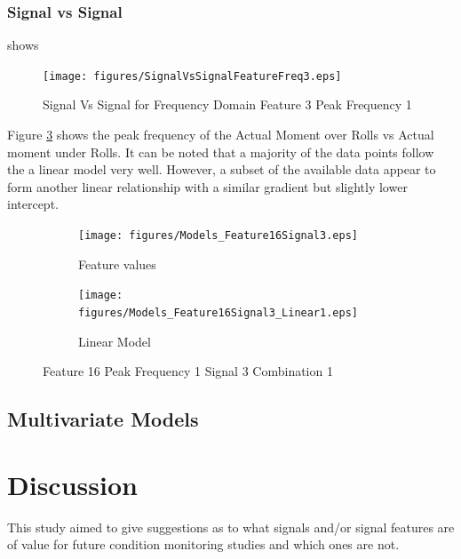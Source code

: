 \documentclass[]{article}
\begin{document}
\subsubsection*{Signal vs Signal}
 shows 
\begin{figure}[H]
    \centering
    \texttt{[image: figures/SignalVsSignalFeatureFreq3.eps]}
    \caption{Signal Vs Signal for Frequency Domain Feature 3 Peak Frequency 1}
    \label{fig:SignalVsSignalFeatureFreq3}
\end{figure}
Figure \ref{fig:Models_Feature16Signal3_Linear1} shows the peak frequency of the Actual Moment over Rolls vs Actual moment under Rolls. It can be noted that a majority of the data points follow the a linear model very well. However, a subset of the available data appear to form another linear relationship with a similar gradient but slightly lower intercept.
\begin{figure}[H]
	\centering
	\begin{subfigure}{.5\textwidth}
		\centering
    		\texttt{[image: figures/Models\_Feature16Signal3.eps]}
	 	\caption{Feature values}
	  	\label{fig:Models_Feature16Signal3}
	\end{subfigure}%
	\begin{subfigure}{.5\textwidth}
	  \centering
 	   	\texttt{[image: figures/Models\_Feature16Signal3\_Linear1.eps]}
	  	\caption{Linear Model}
	  	\label{fig:Models_Feature16Signal3_Linear1}
	\end{subfigure}
   	\caption{Feature 16 Peak Frequency 1 Signal 3 Combination 1}
    \label{fig:Models_Feature16Signal3_Caption}
\end{figure}

\subsection{Multivariate Models}

\clearpage 

\section{Discussion}

This study aimed to give suggestions as to what signals and/or signal features are of value for future condition monitoring studies and which ones are not.
\end{document}
